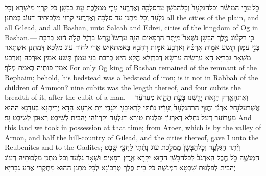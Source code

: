 {כֹּ֣ל \legarmeh  עָרֵ֣י הַמִּישֹׁ֗ר וְכׇל\maqqaf הַגִּלְעָד֙ וְכׇל\maqqaf הַבָּשָׁ֔ן עַד\maqqaf סַלְכָ֖ה וְאֶדְרֶ֑עִי עָרֵ֛י מַמְלֶ֥כֶת ע֖וֹג בַּבָּשָֽׁן׃}
{כֹּל קִרְוֵי מֵישְׁרָא וְכָל גִּלְעָד וְכָל מַתְנַן עַד סַלְכָה וְאֶדְרֶעִי קִרְוֵי מַלְכוּתֵיהּ דְּעוֹג בְּמַתְנַן׃}
{all the cities of the plain, and all Gilead, and all Bashan, unto Salcah and Edrei, cities of the kingdom of Og in Bashan.—}{}
{כִּ֣י רַק\maqqaf ע֞וֹג מֶ֣לֶךְ הַבָּשָׁ֗ן נִשְׁאַר֮ מִיֶּ֣תֶר הָרְפָאִים֒ הִנֵּ֤ה עַרְשׂוֹ֙ עֶ֣רֶשׂ בַּרְזֶ֔ל הֲלֹ֣ה הִ֔וא בְּרַבַּ֖ת בְּנֵ֣י עַמּ֑וֹן תֵּ֧שַׁע אַמּ֣וֹת אׇרְכָּ֗הּ וְאַרְבַּ֥ע אַמּ֛וֹת רׇחְבָּ֖הּ בְּאַמַּת\maqqaf אִֽישׁ׃}
{אֲרֵי לְחוֹד עוֹג מַלְכָּא דְּמַתְנַן אִשְׁתְּאַר מִשְּׁאָר גִּבָּרַיָּא הָא עַרְשֵׂיהּ עַרְשָׂא דְּבַרְזְלָא הֲלָא הִיא בְּרַבַּת בְּנֵי עַמּוֹן תְּשַׁע אַמִּין אוּרְכַּהּ וְאַרְבַּע אַמִּין פּוּתְיַהּ בְּאַמַּת מְלַךְ׃}
{For only Og king of Bashan remained of the remnant of the Rephaim; behold, his bedstead was a bedstead of iron; is it not in Rabbah of the children of Ammon? nine cubits was the length thereof, and four cubits the breadth of it, after the cubit of a man.—}{}
{וְאֶת\maqqaf הָאָ֧רֶץ הַזֹּ֛את יָרַ֖שְׁנוּ בָּעֵ֣ת הַהִ֑וא מֵעֲרֹעֵ֞ר אֲשֶׁר\maqqaf עַל\maqqaf נַ֣חַל אַרְנֹ֗ן וַחֲצִ֤י הַֽר\maqqaf הַגִּלְעָד֙ וְעָרָ֔יו נָתַ֕תִּי לָרֽאוּבֵנִ֖י וְלַגָּדִֽי׃}
{וְיָת אַרְעָא הָדָא יְרֵיתְנָא בְּעִדָּנָא הַהוּא מֵעֲרוֹעֵר דְּעַל נַחְלָא דְּאַרְנוֹן וּפַלְגוּת טוּרָא דְּגִלְעָד וְקִרְווֹהִי יְהַבִית לְשֵׁיבֶט רְאוּבֵן לְשֵׁיבֶט גָּד׃}
{And this land we took in possession at that time; from Aroer, which is by the valley of Arnon, and half the hill-country of Gilead, and the cities thereof, gave I unto the Reubenites and to the Gadites;}{}
{וְיֶ֨תֶר הַגִּלְעָ֤ד וְכׇל\maqqaf הַבָּשָׁן֙ מַמְלֶ֣כֶת ע֔וֹג נָתַ֕תִּי לַחֲצִ֖י שֵׁ֣בֶט הַֽמְנַשֶּׁ֑ה כֹּ֣ל חֶ֤בֶל הָֽאַרְגֹּב֙ לְכׇל\maqqaf הַבָּשָׁ֔ן הַה֥וּא יִקָּרֵ֖א אֶ֥רֶץ רְפָאִֽים׃}
{וּשְׁאָר גִּלְעָד וְכָל מַתְנַן מַלְכוּתֵיהּ דְּעוֹג יְהַבִית לְפַלְגוּת שִׁבְטָא דִּמְנַשֶּׁה כֹּל בֵּית פֶּלֶךְ טְרָכוֹנָא לְכָל מַתְנַן הַהוּא מִתְקְרֵי אֲרַע גִּבָּרַיָּא׃}
